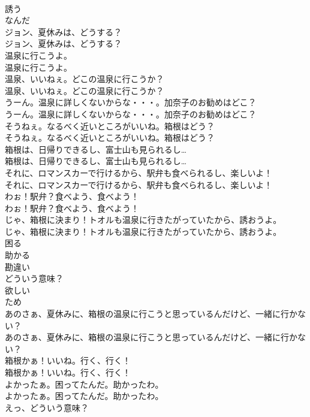 \documentclass[8pt]{extreport}
\begin{document}
\begin{CJK}{UTF8}{min}
\\	誘う
\\	なんだ
\\	ジョン、夏休みは、どうする？	
\\	ジョン、夏休みは、どうする？ 
\\	温泉に行こうよ。	
\\	温泉に行こうよ。 
\\	温泉、いいねぇ。どこの温泉に行こうか？	
\\	温泉、いいねぇ。どこの温泉に行こうか？ 
\\	うーん。温泉に詳しくないからな・・・。加奈子のお勧めはどこ？	
\\	うーん。温泉に詳しくないからな・・・。加奈子のお勧めはどこ？ 
\\	そうねぇ。なるべく近いところがいいね。箱根はどう？	
\\	そうねぇ。なるべく近いところがいいね。箱根はどう？ 
\\	箱根は、日帰りできるし、富士山も見られるし…	
\\	箱根は、日帰りできるし、富士山も見られるし… 
\\	それに、ロマンスカーで行けるから、駅弁も食べられるし、楽しいよ！	
\\	それに、ロマンスカーで行けるから、駅弁も食べられるし、楽しいよ！ 
\\	わぉ！駅弁？食べよう、食べよう！	
\\	わぉ！駅弁？食べよう、食べよう！ 
\\	じゃ、箱根に決まり！トオルも温泉に行きたがっていたから、誘おうよ。	
\\	じゃ、箱根に決まり！トオルも温泉に行きたがっていたから、誘おうよ。 
\\	困る
\\	助かる
\\	勘違い
\\	どういう意味？
\\	欲しい
\\	ため
\\	あのさぁ、夏休みに、箱根の温泉に行こうと思っているんだけど、一緒に行かない？	
\\	あのさぁ、夏休みに、箱根の温泉に行こうと思っているんだけど、一緒に行かない？ 
\\	箱根かぁ！いいね。行く、行く！	
\\	箱根かぁ！いいね。行く、行く！ 
\\	よかったぁ。困ってたんだ。助かったわ。	
\\	よかったぁ。困ってたんだ。助かったわ。 
\\	えっ、どういう意味？	

\end{CJK}
\end{document}
